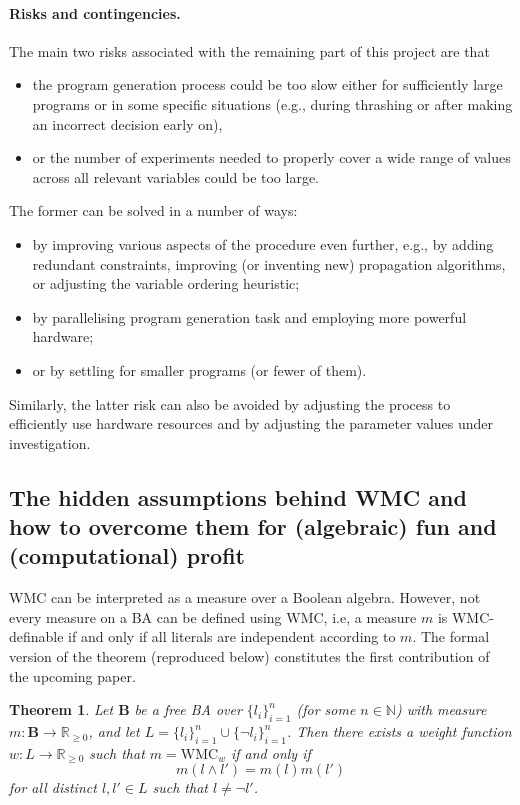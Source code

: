 \documentclass{article}
\newtheorem{theorem}{Theorem}
\begin{document}
\paragraph{Risks and contingencies.} The main two risks associated with the
remaining part of this project are that
\begin{itemize}
\item the program generation process could be too slow either for sufficiently
  large programs or in some specific situations (e.g., during thrashing or after
  making an incorrect decision early on),
\item or the number of experiments needed to properly cover a wide range of
  values across all relevant variables could be too large.
\end{itemize}
The former can be solved in a number of ways:
\begin{itemize}
\item by improving various aspects of the procedure even further, e.g., by
  adding redundant constraints, improving (or inventing new) propagation
  algorithms, or adjusting the variable ordering heuristic;
\item by parallelising program generation task and employing more powerful
  hardware;
\item or by settling for smaller programs (or fewer of them).
\end{itemize}
Similarly, the latter risk can also be avoided by adjusting the process to
efficiently use hardware resources and by adjusting the parameter values under
investigation.

\subsection{The hidden assumptions behind WMC and how to overcome them for
  (algebraic) fun and (computational) profit} \label{sec:ba}

WMC can be interpreted as a measure over a Boolean algebra. However, not every
measure on a BA can be defined using WMC, i.e, a measure $m$ is WMC-definable if
and only if all literals are independent according to $m$. The formal version of
the theorem (reproduced below) constitutes the first contribution of the
upcoming paper.

\begin{theorem}
  Let $\mathbf{B}$ be a free BA over $\{ l_i \}_{i=1}^n$ (for some $n \in
  \mathbb{N}$) with measure $m\colon \mathbf{B} \to \mathbb{R}_{\ge 0}$, and let
  $L = \{ l_i \}_{i = 1}^n \cup \{ \neg l_i \}_{i = 1}^n$. Then there exists a
  weight function $w\colon L \to \mathbb{R}_{\ge 0}$ such that $m =
  \mathrm{WMC}_w$ if and only if
  \[
  m(l \land l') = m(l)m(l')
  \]
  for all distinct $l, l' \in L$ such that $l \ne \neg l'$.
\end{theorem}
\end{document}
